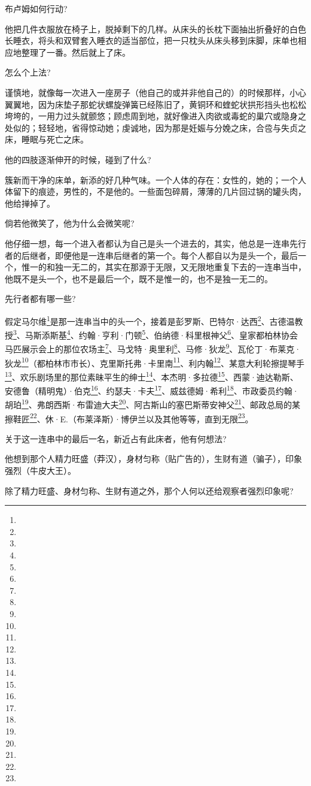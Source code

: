\par 布卢姆如何行动?
\par 他把几件衣服放在椅子上，脱掉剩下的几样。从床头的长枕下面抽出折叠好的白色长睡衣，将头和双臂套入睡衣的适当部位，把一只枕头从床头移到床脚，床单也相应地整理了一番。然后就上了床。
\par 怎么个上法?
\par 谨慎地，就像每一次进入一座房子（他自己的或并非他自己的）的时候那样，小心翼翼地，因为床垫子那蛇状螺旋弹簧已经陈旧了，黄铜环和蝰蛇状拱形挡头也松松垮垮的，一用力过头就颤悠；顾虑周到地，就好像进入肉欲或毒蛇的巢穴或隐身之处似的；轻轻地，省得惊动她；虔诚地，因为那是妊娠与分娩之床，合卺与失贞之床，睡眠与死亡之床。
\par 他的四肢逐渐伸开的时候，碰到了什么?
\par 簇新而干净的床单，新添的好几种气味。一个人体的存在：女性的，她的；一个人体留下的痕迹，男性的，不是他的。一些面包碎屑，薄薄的几片回过锅的罐头肉，他给掸掉了。
\par 倘若他微笑了，他为什么会微笑呢?
\par 他仔细一想，每一个进入者都认为自己是头一个进去的，其实，他总是一连串先行者的后继者，即便他是一连串后继者的第一个。每个人都自以为是头一个，最后一个，惟一的和独一无二的，其实在那源于无限，又无限地重复下去的一连串当中，他既不是头一个，也不是最后一个，既不是惟一的，也不是独一无二的。
\par 先行者都有哪一些?
\par 假定马尔维\footnote{}是那一连串当中的头一个，接着是彭罗斯、巴特尔·达西\footnote{}、古德温教授\footnote{}、马斯添斯基\footnote{}、约翰·亨利·门顿\footnote{}、伯纳德·科里根神父\footnote{}、皇家都柏林协会马匹展示会上的那位农场主\footnote{}、马戈特·奥里利\footnote{}、马修·狄龙\footnote{}、瓦伦丁·布莱克·狄龙\footnote{}（都柏林市市长）、克里斯托弗·卡里南\footnote{}、利内翰\footnote{}、某意大利轮擦提琴手\footnote{}、欢乐剧场里的那位素昧平生的绅士\footnote{}、本杰明·多拉德\footnote{}、西蒙·迪达勒斯、安德鲁（精明鬼）·伯克\footnote{}、约瑟夫·卡夫\footnote{}、威兹德姆·希利\footnote{}、市政委员约翰·胡珀\footnote{}、弗朗西斯·布雷迪大夫\footnote{}、阿古斯山的塞巴斯蒂安神父\footnote{}、邮政总局的某擦鞋匠\footnote{}、休·E.（布莱泽斯）·博伊兰以及其他等等，直到无限\footnote{}。
\par 关于这一连串中的最后一名，新近占有此床者，他有何想法?
\par 他想到那个人精力旺盛（莽汉），身材匀称（贴广告的），生财有道（骗子），印象强烈（牛皮大王）。
\par 除了精力旺盛、身材匀称、生财有道之外，那个人何以还给观察者强烈印象呢?
